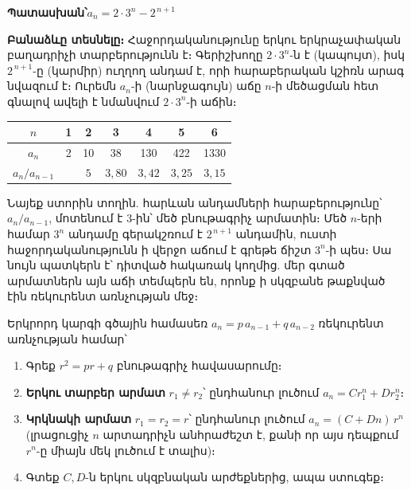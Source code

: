 \documentclass[11pt,a4paper]{article}
\newcommand{\answer}[1]{\begin{answerbox}\centering\textbf{Պատասխան՝}\quad #1\end{answerbox}}
\begin{document}
\answer{$\displaystyle a_n = 2\cdot 3^n - 2^{\,n+1}$}

\medskip
\textbf{Բանաձևը տեսնելը։}
Հաջորդականությունը երկու երկրաչափական բաղադրիչի տարբերությունն է։ Գերիշխողը $2\cdot3^n$-ն է
(կապույտ), իսկ $2^{\,n+1}$-ը (կարմիր) ուղղող անդամ է, որի հարաբերական կշիռն արագ նվազում է։ Ուրեմն
$a_n$-ի (նարնջագույն) աճը $n$-ի մեծացման հետ գնալով ավելի է նմանվում $2\cdot3^n$-ի աճին։

\begin{center}
\end{center}

\begin{center}
\small
\begin{tabular}{@{}c|cccccc@{}}
\toprule
$n$ & 1 & 2 & 3 & 4 & 5 & 6\\
\midrule
$a_n$ & 2 & 10 & 38 & 130 & 422 & 1330\\
$a_n/a_{n-1}$ & & $5$ & $3{,}80$ & $3{,}42$ & $3{,}25$ & $3{,}15$\\
\bottomrule
\end{tabular}
\end{center}

\smallskip
Նայեք ստորին տողին. հարևան անդամների հարաբերությունը՝ $a_n/a_{n-1}$, մոտենում է $3$-ին՝ մեծ
բնութագրիչ արմատին։ Մեծ $n$-երի համար $3^n$ անդամը գերակշռում է $2^{\,n+1}$ անդամին, ուստի
հաջորդականությունն ի վերջո աճում է գրեթե ճիշտ $3^n$-ի պես։ Սա նույն պատկերն է՝ դիտված հակառակ
կողմից. մեր գտած արմատներն այն աճի տեմպերն են, որոնք ի սկզբանե թաքնված էին ռեկուրենտ
առնչության մեջ։

\begin{methodbox}
Երկրորդ կարգի գծային համասեռ $a_n=p\,a_{n-1}+q\,a_{n-2}$ ռեկուրենտ առնչության համար՝
\begin{enumerate}[leftmargin=1.5em,itemsep=1pt]
  \item Գրեք $r^2=pr+q$ բնութագրիչ հավասարումը։
  \item \textbf{Երկու տարբեր արմատ} $r_1\neq r_2$՝ ընդհանուր լուծում $a_n=C r_1^n+D r_2^n$։
  \item \textbf{Կրկնակի արմատ} $r_1=r_2=r$՝ ընդհանուր լուծում $a_n=(C+Dn)\,r^n$
        (լրացուցիչ $n$ արտադրիչն անհրաժեշտ է, քանի որ այս դեպքում $r^n$-ը միայն մեկ լուծում է տալիս)։
  \item Գտեք $C,D$-ն երկու սկզբնական արժեքներից, ապա ստուգեք։
\end{enumerate}
\end{methodbox}
\end{document}
